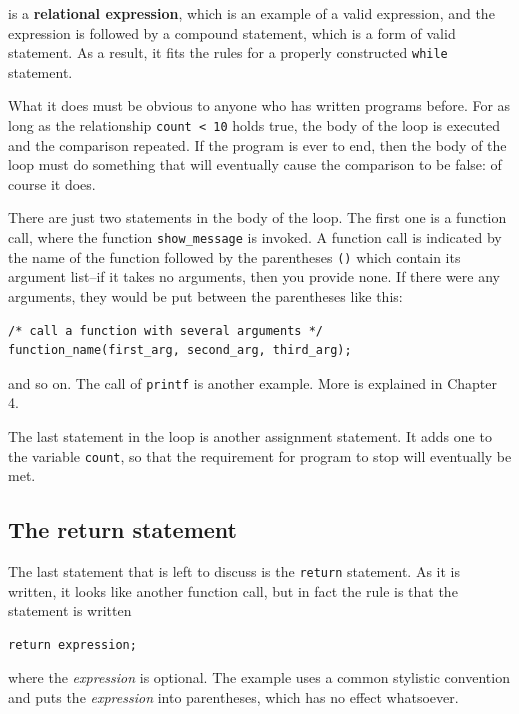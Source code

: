    is a \textbf{relational expression}, which is an example of a valid
    expression, and the expression is followed by a compound statement, which
    is a form of valid statement. As a result, it fits the rules for a properly
    constructed \texttt{while} statement.


   What it does must be obvious to anyone who has written programs
    before. For as long as the relationship \texttt{count < 10} holds
    true, the body of the loop is executed and the comparison repeated. If the
    program is ever to end, then the body of the loop must do something that
    will eventually cause the comparison to be false: of course it does.


   There are just two statements in the body of the loop. The first one is a
    function call, where the function \texttt{show\_message} is invoked. A
    function call is indicated by the name of the function followed by the
    parentheses \texttt{()} which contain its argument list--if it
    takes no arguments, then you provide none. If there were any arguments,
    they would be put between the parentheses like this:


   \begin{Verbatim}
/* call a function with several arguments */
function_name(first_arg, second_arg, third_arg);
\end{Verbatim}

   and so on. The call of \texttt{printf} is another example. More is
    explained in Chapter 4.


   The last statement in the loop is another assignment statement. It adds
    one to the variable \texttt{count}, so that the requirement for program
    to stop will eventually be met.


  

  \subsection{The return statement}
   

   The last statement that is left to discuss is the \texttt{return}
    statement. As it is written, it looks like another function call, but in
    fact the rule is that the statement is written


   \begin{Verbatim}
return expression;
\end{Verbatim}

   where the \textit{expression} is optional. The example uses a common
    stylistic convention and puts the \textit{expression} into parentheses,
    which has no effect whatsoever.


